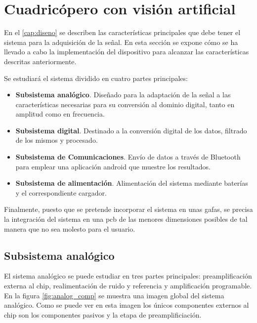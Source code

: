 \chapter{Cuadricópero con visión artificial}\label{sec: Cuadricóptero}
En el \autoref{cap:diseno} se describen las características principales que debe tener el sistema para la adquisición de la señal. En esta sección se expone cómo se ha llevado a cabo la implementación del dispositivo para alcanzar las características descritas anteriormente.

Se estudiará el sistema dividido en cuatro partes principales:
\begin{itemize}

	\item \textbf{Subsistema analógico}. Diseñado para la adaptación de la señal a las características necesarias para su conversión al dominio digital, tanto en amplitud como en frecuencia.
	\item \textbf{Subsistema digital}. Destinado a la conversión digital de los datos, filtrado de los mismos y procesado.
	\item \textbf{Subsistema de Comunicaciones}. Envío de datos a través de Bluetooth para emplear una aplicación android que muestre los resultados.
	\item \textbf{Subsistema de alimentación}. Alimentación del sistema mediante baterías y el correspondiente cargador.
	
\end{itemize}

Finalmente, puesto que se pretende incorporar el sistema en unas gafas, se precisa la integración del sistema en una \acrshort{pcb} de las menores dimensiones posibles de tal manera que no sea molesto para el usuario.



\section{Subsistema analógico}
El sistema analógico se puede estudiar en tres partes principales: preamplificación externa al chip, realimentación de ruido y referencia y amplificación programable. En la figura \ref{fig:analog_comp} se muestra una imagen global del sistema analógico. Como se puede ver en esta imagen los únicos componentes externos al chip son los componentes pasivos y la etapa de preamplificiación.



